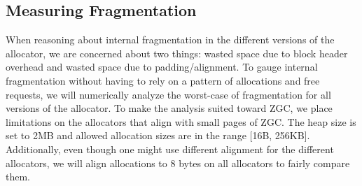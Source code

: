 

%



\newpage
\subsection{Measuring Fragmentation}

When reasoning about internal fragmentation in the different versions of the allocator, we are concerned about two things: wasted space due to block header overhead and wasted space due to padding/alignment. To gauge internal fragmentation without having to rely on a pattern of allocations and free requests, we will numerically analyze the worst-case of fragmentation for all versions of the allocator. To make the analysis suited toward ZGC, we place limitations on the allocators that align with small pages of ZGC. The heap size is set to 2MB and allowed allocation sizes are in the range [16B, 256KB]. Additionally, even though one might use different alignment for the different allocators, we will align allocations to 8 bytes on all allocators to fairly compare them.

